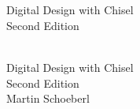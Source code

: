 \documentclass[%
    10pt,
    headinclude, footexclude,
    openright, %
    notitlepage,
    cleardoubleempty,
    headsepline,
    pointlessnumbers,
    bibtotoc, idxtotoc,
    ]{scrbook}
\newif\ifbook
\begin{document}
\ifbook
\else

\newpage
\thispagestyle{empty}
~
\newpage
\fi



\begin{flushleft}
\pagestyle{empty}
\ \\
\vspace{1cm}
{\mdseries\huge Digital Design with Chisel}
\ \\
\vspace{1cm}
{\mdseries\Large Second Edition}
\cleardoublepage
\end{flushleft}
\newpage


\begin{flushleft}
\pagestyle{empty}
\ \\
\vspace{1cm}
{\Huge Digital Design with Chisel\\
\bigskip
{\huge Second Edition}\\
\bigskip
\bigskip
\bigskip
\bigskip
\bigskip
{\huge Martin Schoeberl}
\medskip\\

}

\newpage
\end{flushleft}
\end{document}
